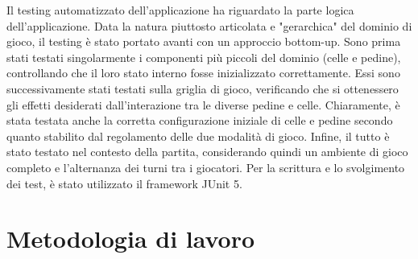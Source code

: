 \documentclass[a4paper,12pt]{report}
\begin{document}
Il testing automatizzato dell'applicazione ha riguardato la parte logica dell'applicazione. Data la natura piuttosto articolata e "gerarchica" del dominio di gioco, il testing è stato portato avanti con un approccio bottom-up. Sono prima stati testati singolarmente i componenti più piccoli del dominio (celle e pedine), controllando che il loro stato interno fosse inizializzato correttamente. Essi sono successivamente stati testati sulla griglia di gioco, verificando che si ottenessero gli effetti desiderati dall'interazione tra le diverse pedine e celle. Chiaramente, è stata testata anche la corretta configurazione iniziale di celle e pedine secondo quanto stabilito dal regolamento delle due modalità di gioco. Infine, il tutto è stato testato nel contesto della partita, considerando quindi un ambiente di gioco completo e l'alternanza dei turni tra i giocatori.
Per la scrittura e lo svolgimento dei test, è stato utilizzato il framework JUnit 5.

\section{Metodologia di lavoro}
\end{document}
